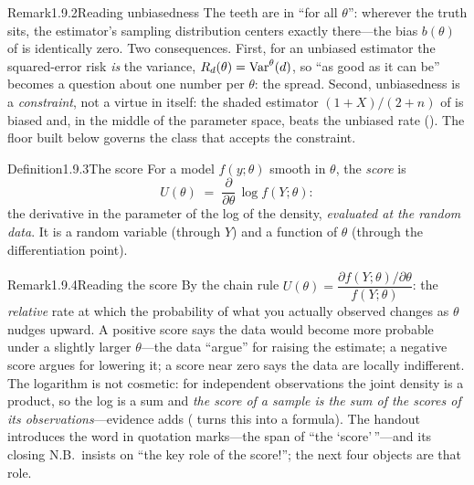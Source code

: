\documentclass[main.tex]{subfiles}
\begin{document}
\begin{ObjL}{Remark}{1.9.2}{Reading unbiasedness}
The teeth are in ``for all $\theta$'': wherever the truth sits, the estimator's sampling
distribution centers exactly there---the bias $b(\theta)$ of  is identically
zero. Two consequences. First, for an unbiased estimator the squared-error risk \emph{is} the
variance, $R_d(\theta)=\operatorname{Var}^{\theta}(d)$, so ``as good as it can be'' becomes a question
about one number per $\theta$: the spread. Second, unbiasedness is a \emph{constraint}, not a
virtue in itself: the shaded estimator $(1+X)/(2+n)$ of  is biased and, in the
middle of the parameter space, beats the unbiased rate (). The floor built below
governs the class that accepts the constraint.
\end{ObjL}

\begin{Obj}{Definition}{1.9.3}{The score}
For a model $f(y;\theta)$ smooth in $\theta$, the \emph{score} is
\[ U(\theta) \;=\; \frac{\partial}{\partial\theta}\,\log f(Y;\theta) : \]
the derivative in the parameter of the log of the density, \emph{evaluated at the random
data}. It is a random variable (through $Y$) and a function of $\theta$ (through the
differentiation point).
\end{Obj}

\begin{ObjL}{Remark}{1.9.4}{Reading the score}
By the chain rule $U(\theta)=\dfrac{\partial f(Y;\theta)/\partial\theta}{f(Y;\theta)}$: the
\emph{relative} rate at which the probability of what you actually observed changes as
$\theta$ nudges upward. A positive score says the data would become more probable under a
slightly larger $\theta$---the data ``argue'' for raising the estimate; a negative score
argues for lowering it; a score near zero says the data are locally indifferent. The
logarithm is not cosmetic: for independent observations the joint density is a product, so
the log is a sum and \emph{the score of a sample is the sum of the scores of its
observations}---evidence adds ( turns this into a formula). The handout
introduces the word in quotation marks---the span of ``the `score'\,''---and its closing
N.B.\ insists on ``the key role of the score!''; the next four objects are that role.
\end{ObjL}
\end{document}
